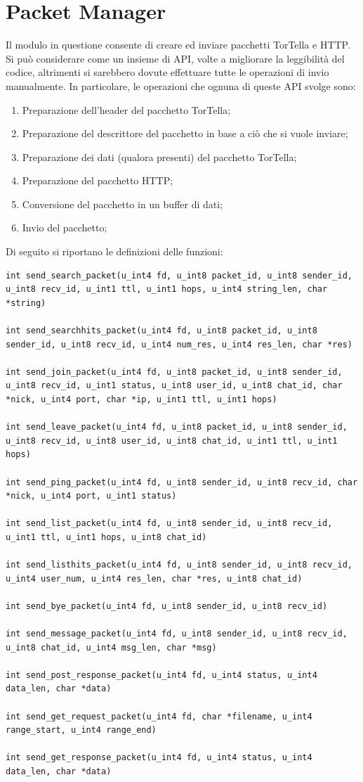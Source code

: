 \section{Packet Manager}
Il modulo in questione consente di creare ed inviare pacchetti TorTella e HTTP. Si può considerare come un insieme di API, volte a migliorare la leggibilità del codice, altrimenti si sarebbero dovute effettuare tutte le operazioni di invio manualmente. In particolare, le operazioni che ognuna di queste API svolge sono:
\begin{enumerate}
\item Preparazione dell'header del pacchetto TorTella; 
\item Preparazione del descrittore del pacchetto in base a ciò che si vuole inviare;
\item Preparazione dei dati (qualora presenti) del pacchetto TorTella;
\item Preparazione del pacchetto HTTP;
\item Conversione del pacchetto in un buffer di dati;
\item Invio del pacchetto;
\end{enumerate}
Di seguito si riportano le definizioni delle funzioni:
\begin{lstlisting}[frame=trBL]
int send_search_packet(u_int4 fd, u_int8 packet_id, u_int8 sender_id, u_int8 recv_id, u_int1 ttl, u_int1 hops, u_int4 string_len, char *string)

int send_searchhits_packet(u_int4 fd, u_int8 packet_id, u_int8 sender_id, u_int8 recv_id, u_int4 num_res, u_int4 res_len, char *res)

int send_join_packet(u_int4 fd, u_int8 packet_id, u_int8 sender_id, u_int8 recv_id, u_int1 status, u_int8 user_id, u_int8 chat_id, char *nick, u_int4 port, char *ip, u_int1 ttl, u_int1 hops)

int send_leave_packet(u_int4 fd, u_int8 packet_id, u_int8 sender_id, u_int8 recv_id, u_int8 user_id, u_int8 chat_id, u_int1 ttl, u_int1 hops)

int send_ping_packet(u_int4 fd, u_int8 sender_id, u_int8 recv_id, char *nick, u_int4 port, u_int1 status)

int send_list_packet(u_int4 fd, u_int8 sender_id, u_int8 recv_id, u_int1 ttl, u_int1 hops, u_int8 chat_id)

int send_listhits_packet(u_int4 fd, u_int8 sender_id, u_int8 recv_id, u_int4 user_num, u_int4 res_len, char *res, u_int8 chat_id)

int send_bye_packet(u_int4 fd, u_int8 sender_id, u_int8 recv_id)

int send_message_packet(u_int4 fd, u_int8 sender_id, u_int8 recv_id, u_int8 chat_id, u_int4 msg_len, char *msg)

int send_post_response_packet(u_int4 fd, u_int4 status, u_int4 data_len, char *data)

int send_get_request_packet(u_int4 fd, char *filename, u_int4 range_start, u_int4 range_end)

int send_get_response_packet(u_int4 fd, u_int4 status, u_int4 data_len, char *data)
\end{lstlisting}
